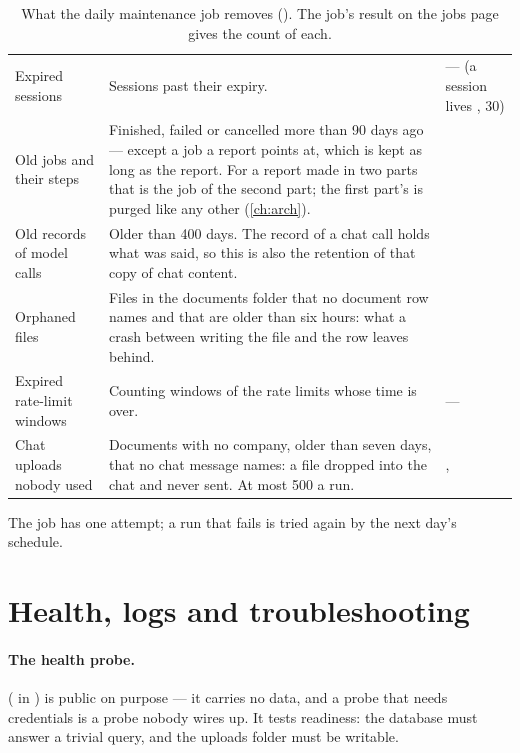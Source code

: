 \begin{table}[H]
\caption{What the daily maintenance job removes (). The job's result
on the jobs page gives the count of each.}\label{tab:ops:maintenance}
\begin{tabularx}{\textwidth}{@{}L{38mm}YL{45mm}@{}}
\toprule
{} &  &  \\
\midrule
Expired sessions & Sessions past their expiry. & --- (a session lives , 30) \\
Old jobs and their steps & Finished, failed or cancelled more than 90 days ago --- except a job a report points at, which is kept as long as the report. For a report made in two parts that is the job of the second part; the first part's is purged like any other (\cref{ch:arch}). &  \\
Old records of model calls & Older than 400 days. The record of a chat call holds what was said, so this is also the retention of that copy of chat content. &  \\
Orphaned files & Files in the documents folder that no document row names and that are older than six hours: what a crash between writing the file and the row leaves behind. &  \\
Expired rate-limit windows & Counting windows of the rate limits whose time is over. & --- \\
Chat uploads nobody used & Documents with no company, older than seven days, that no chat message names: a file dropped into the chat and never sent. At most 500 a run. & ,  \\
\bottomrule
\end{tabularx}
\end{table}

The job has one attempt; a run that fails is tried again by the next day's schedule.


\section{Health, logs and troubleshooting}\label{sec:ops:health}

\paragraph{The health probe.}  ( in
) is public on purpose --- it carries no data, and a probe that needs
credentials is a probe nobody wires up. It tests readiness: the database must answer a
trivial query, and the uploads folder must be writable.

